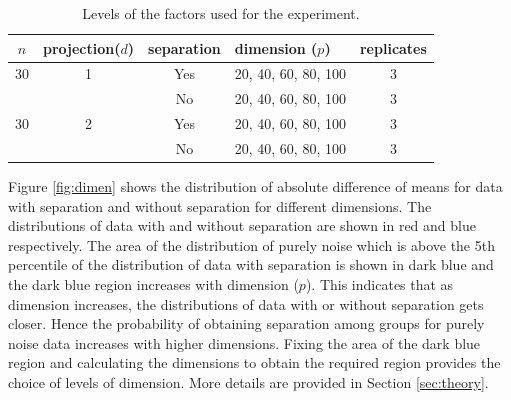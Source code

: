 \begin{table}[htbp]
\begin{center}
\caption{Levels of the factors used for the experiment.}
\begin{tabular}{cccp{2.2cm}|c}
  \hline
  \hline
  $n$ & projection($d$) & separation & dimension ($p$) & replicates\\
  \hline
  30 & 1 & Yes & 20, 40, 60, 80, 100 & 3 \\
      & & No & 20, 40, 60, 80, 100 & 3\\
   30 & 2 & Yes & 20, 40, 60, 80, 100 & 3 \\
     & & No & 20, 40, 60, 80, 100 & 3\\   
      \hline
\end{tabular}
\label{freq}
\end{center}
\end{table} 

Figure \ref{fig:dimen} shows the distribution of absolute difference of means for data with separation and without separation for different dimensions. The distributions of data with and without separation are shown in red and blue respectively. The area of the distribution of purely noise which is above the 5th percentile of the distribution of data with separation is shown in dark blue and the dark blue region increases with dimension ($p$). This indicates that as dimension increases, the distributions of data with or without separation gets closer. Hence the probability of obtaining separation among groups for purely noise data increases with higher dimensions. Fixing the area of the dark blue region and calculating the dimensions to obtain the required region provides the choice of levels of dimension. More details are provided in Section \ref{sec:theory}. 

